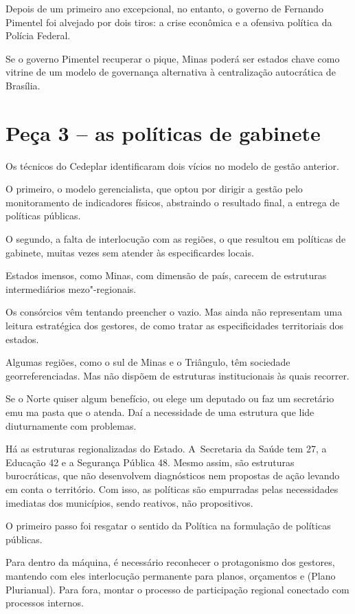 Depois de um primeiro ano excepcional, no entanto, o governo de Fernando
Pimentel foi alvejado por dois tiros: a crise econômica e a ofensiva
política da Polícia Federal.

Se o governo Pimentel recuperar o pique, Minas poderá ser estados chave
como vitrine de um modelo de governança alternativa à centralização
autocrática de Brasília.

\section{Peça 3 -- as políticas de gabinete}

Os técnicos do Cedeplar identificaram dois vícios no modelo de gestão
anterior.

O primeiro, o modelo gerencialista, que optou por dirigir a gestão pelo
monitoramento de indicadores físicos, abstraindo o resultado final, a
entrega de políticas públicas.

O segundo, a falta de interlocução com as regiões, o que resultou em
políticas de gabinete, muitas vezes sem atender às especificardes
locais.

Estados imensos, como Minas, com dimensão de país, carecem de estruturas
intermediários mezo"-regionais.

Os consórcios vêm tentando preencher o vazio. Mas ainda não representam
uma leitura estratégica dos gestores, de como tratar as especificidades
territoriais dos estados.

Algumas regiões, como o sul de Minas e o Triângulo, têm sociedade
georreferenciadas. Mas não dispõem de estruturas institucionais às quais
recorrer.

Se o Norte quiser algum benefício, ou elege um deputado ou faz um
secretário emu ma pasta que o atenda. Daí a necessidade de uma estrutura
que lide diuturnamente com problemas.

Há as estruturas regionalizadas do Estado. A~Secretaria da Saúde tem 27,
a Educação 42 e a Segurança Pública 48. Mesmo assim, são estruturas
burocráticas, que não desenvolvem diagnósticos nem propostas de ação
levando em conta o território. Com isso, as políticas são empurradas
pelas necessidades imediatas dos municípios, sendo reativos, não
propositivos.

O primeiro passo foi resgatar o sentido da Política na formulação de
políticas públicas.

Para dentro da máquina, é necessário reconhecer o protagonismo dos
gestores, mantendo com eles interlocução permanente para planos,
orçamentos e  (Plano Plurianual). Para fora, montar o processo de
participação regional conectado com processos internos.

